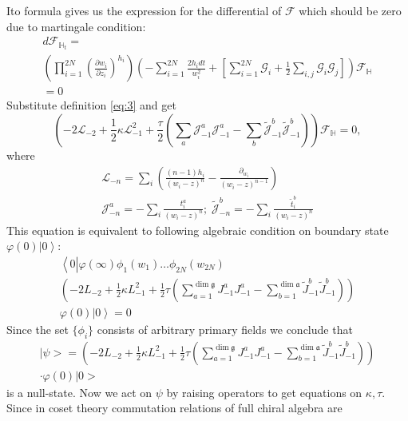 \documentclass{jetpl}
\newcommand{\gf}{\mathfrak{g}}
\newcommand{\af}{\mathfrak{a}}
\begin{document}
 Ito formula  gives us the expression for the differential of $\mathcal{F}$ which should be zero due to martingale condition:
\begin{multline}
d \mathcal{F}_{\mathbb{H}_{t}}=\\ \left(\prod_{i=1}^{2N}\left(\frac{\partial w_{i}}{\partial z_{i}}\right)^{h_{i}}\right)
\left(-\sum_{i=1}^{2N}\frac{2h_{i}dt}{w_{i}^{2}}+\left[\sum_{i=1}^{2N}\mathcal{G}_{i}+\frac{1}{2}
      \sum_{i,j}\mathcal{G}_{i}\mathcal{G}_{j}\right]\right)\mathcal{F}_{\mathbb{H}}\\=0
\label{eq:8}
\end{multline}
Substitute definition \eqref{eq:3} and get 
\begin{equation}
  \left(-2 \mathcal{L}_{-2}+\frac{1}{2}\kappa \mathcal{L}_{-1}^{2}+\frac{\tau}{2}\left( \sum_{a} \mathcal{J}^{a}_{-1} \mathcal{J}^{a}_{-1}-
      \sum_{b}\tilde{\mathcal{J}}^{b}_{-1} \tilde{\mathcal{J}}^{b}_{-1}\right)\right)        \mathcal{F}_{\mathbb{H}}=0,
  \label{eq:4}
\end{equation}
where
\begin{eqnarray*}
  \mathcal{L}_{-n}=\sum_{i}\left(\frac{(n-1)h_{i}}{(w_{i}-z)^{n}}-\frac{\partial_{w_{i}}}{(w_{i}-z)^{n-1}}\right)\\ \mathcal{J}^{a}_{{-n}}=-\sum_{i}\frac{t^{a}_{i}}{(w_{i}-z)^{n}};\; \tilde{\mathcal{J}}^{b}_{{-n}}=-\sum_{i}\frac{\tilde{t}^{b}_{i}}{(w_{i}-z)^{n}}
\end{eqnarray*}
This equation is equivalent to following algebraic condition on boundary state $\varphi(0)\left|0\right>$:
\begin{multline}
  \label{eq:7}
  \left<0\left|\varphi(\infty)\phi_{1}(w_{1})\dots\phi_{2N}(w_{2N})\right.\right.\\
  \left(-2L_{-2}+\frac{1}{2}\kappa L_{-1}^{2}+\frac{1}{2}\tau \left(\sum_{a=1}^{\dim\gf}J^{a}_{-1}J^{a}_{-1}-\sum_{b=1}^{\dim\af}\tilde{J}^{b}_{-1}\tilde{J}^{b}_{-1}\right)\right)\\
\left.\varphi(0)|0\right>=0
\end{multline}
Since the set $\{\phi_{i}\}$ consists of arbitrary primary fields we conclude that 
\begin{multline}
|\psi>=\left(-2L_{-2}+\frac{1}{2}\kappa L_{-1}^{2}+\frac{1}{2}\tau \left(\sum_{a=1}^{\dim\gf}J^{a}_{-1}J^{a}_{-1}-\sum_{b=1}^{\dim\af}\tilde{J}^{b}_{-1}\tilde{J}^{b}_{-1}\right)\right)\\
\cdot\varphi(0)|0>
\end{multline}
is a null-state. Now we act on $\psi$ by raising operators to get equations on $\kappa,\tau$. Since in coset theory commutation relations of full chiral algebra are
\end{document}
